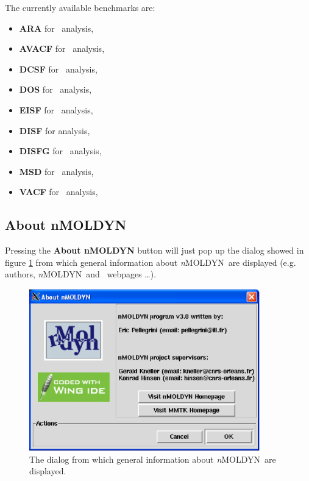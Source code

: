 \documentclass[a4paper,11pt]{report}
\newcommand{\NMOLDYN}{\textit{n}MOLDYN}
\begin{document}
The currently available benchmarks are:
\begin{itemize}
\item \textbf{ARA} for \ARA\ analysis,
\item \textbf{AVACF} for \AVACF\ analysis,
\item \textbf{DCSF} for \DCSF\ analysis,
\item \textbf{DOS} for \DOS\ analysis,
\item \textbf{EISF} for \EISF\ analysis,
\item \textbf{DISF} for \DISF analysis,
\item \textbf{DISFG} for \DISFG\ analysis,
\item \textbf{MSD} for \MSD\ analysis,
\item \textbf{VACF} for \VACF\ analysis,
\end{itemize}
\newpage
\subsection{About nMOLDYN}
\label{about_nmoldyn}
Pressing the \textbf{About nMOLDYN} button will just pop up the dialog showed in figure \ref{fig:about_nmoldyn} from which 
general information about \NMOLDYN\ are displayed (e.g. authors, \NMOLDYN\ and \MMTK\ webpages \ldots ).
\begin{figure}[h!]
\begin{center}
\includegraphics[width=10cm]{Figures/about_nmoldyn.eps}
\end{center}
\caption[The about dialog]{The dialog from which general information about \NMOLDYN\ are displayed.}
\label{fig:about_nmoldyn}
\end{figure}
\end{document}
